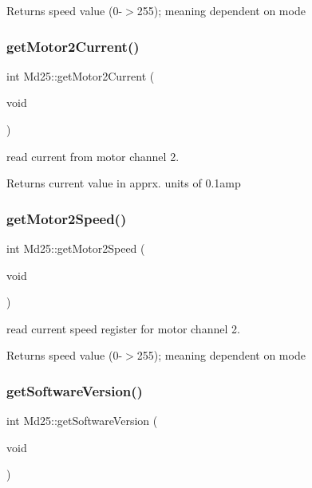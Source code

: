 \begin{DoxyReturn}{Returns}
speed value (0-\/$>$255); meaning dependent on mode 
\end{DoxyReturn}
\mbox{\label{classMd25_a7c7811080004fe8c066b4fd50260e252}} 
\subsubsection{\texorpdfstring{get\+Motor2\+Current()}{getMotor2Current()}}
{\footnotesize\ttfamily int Md25\+::get\+Motor2\+Current (\begin{DoxyParamCaption}\item[{void}]{ }\end{DoxyParamCaption})}



read current from motor channel 2. 

\begin{DoxyReturn}{Returns}
current value in apprx. units of 0.\+1amp 
\end{DoxyReturn}
\mbox{\label{classMd25_a2ff03a376f76d6e0132a722fe77acfb7}} 
\subsubsection{\texorpdfstring{get\+Motor2\+Speed()}{getMotor2Speed()}}
{\footnotesize\ttfamily int Md25\+::get\+Motor2\+Speed (\begin{DoxyParamCaption}\item[{void}]{ }\end{DoxyParamCaption})}



read current speed register for motor channel 2. 

\begin{DoxyReturn}{Returns}
speed value (0-\/$>$255); meaning dependent on mode 
\end{DoxyReturn}
\mbox{\label{classMd25_ada7700354c1d30fa2463b364ab705247}} 
\subsubsection{\texorpdfstring{get\+Software\+Version()}{getSoftwareVersion()}}
{\footnotesize\ttfamily int Md25\+::get\+Software\+Version (\begin{DoxyParamCaption}\item[{void}]{ }\end{DoxyParamCaption})}



